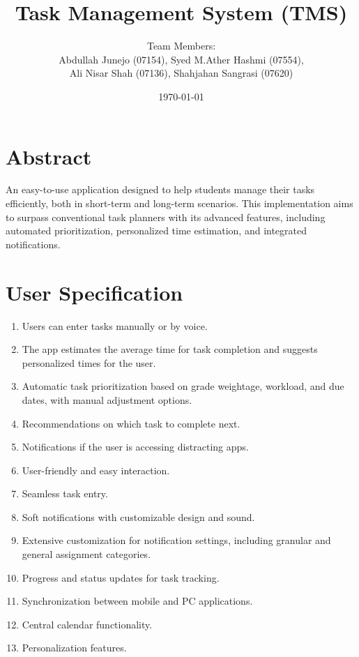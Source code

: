 \documentclass{article}
\title{\LARGE Task Management System (TMS) \\}
\author{Team Members: \\
Abdullah Junejo (07154), Syed M.Ather Hashmi (07554), \\
Ali Nisar Shah (07136), Shahjahan Sangrasi (07620)}
\date{\today} %
\begin{document}
\maketitle

\section*{Abstract}
An easy-to-use application designed to help students manage their tasks efficiently, both in short-term and long-term scenarios. This implementation aims to surpass conventional task planners with its advanced features, including automated prioritization, personalized time estimation, and integrated notifications.

\section{User Specification}
\begin{enumerate}
    \item Users can enter tasks manually or by voice.
    \item The app estimates the average time for task completion and suggests personalized times for the user.
    \item Automatic task prioritization based on grade weightage, workload, and due dates, with manual adjustment options.
    \item Recommendations on which task to complete next.
    \item Notifications if the user is accessing distracting apps.
    \item User-friendly and easy interaction.
    \item Seamless task entry.
    \item Soft notifications with customizable design and sound.
    \item Extensive customization for notification settings, including granular and general assignment categories.
    \item Progress and status updates for task tracking.
    \item Synchronization between mobile and PC applications.
    \item Central calendar functionality.
    \item Personalization features.
\end{enumerate}
\end{document}
